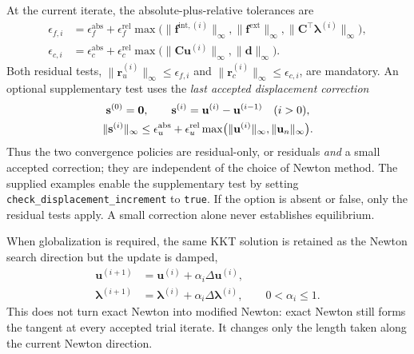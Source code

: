 \documentclass[11pt,a4paper]{article}
\newcommand{\vct}[1]{\mathbf{#1}}
\begin{document}
At the current iterate, the absolute-plus-relative tolerances are
\begin{equation}
\begin{aligned}
\epsilon_{f,i}&=\epsilon_f^{\mathrm{abs}}+\epsilon_f^{\mathrm{rel}}
\max\bigl(\lVert\vct f^{\mathrm{int},(i)}\rVert_\infty,
\lVert\vct f^{\mathrm{ext}}\rVert_\infty,
\lVert\vct C^\top\vct\lambda^{(i)}\rVert_\infty\bigr),\\
\epsilon_{c,i}&=\epsilon_c^{\mathrm{abs}}+\epsilon_c^{\mathrm{rel}}
\max\bigl(\lVert\vct C\vct u^{(i)}\rVert_\infty,
\lVert\vct d\rVert_\infty\bigr).
\end{aligned}
\label{eq:kkt-convergence-scales}
\end{equation}
Both residual tests, $\lVert\vct r_u^{(i)}\rVert_\infty\leq\epsilon_{f,i}$ and
$\lVert\vct r_c^{(i)}\rVert_\infty\leq\epsilon_{c,i}$, are mandatory.
An optional supplementary test uses the \emph{last accepted displacement correction}
\begin{gather}
\vct s^{(0)}=\vct0,\qquad
\vct s^{(i)}=\vct u^{(i)}-\vct u^{(i-1)}\quad(i>0),\notag\\
\lVert\vct s^{(i)}\rVert_\infty\leq
\epsilon_u^{\mathrm{abs}}+\epsilon_u^{\mathrm{rel}}
\max\bigl(\lVert\vct u^{(i)}\rVert_\infty,\lVert\vct u_n\rVert_\infty\bigr).
\label{eq:kkt-correction-convergence}
\end{gather}
Thus the two convergence policies are residual-only, or residuals \emph{and} a small accepted correction; they are independent of the choice of Newton method. The supplied examples enable the supplementary test by setting \texttt{check\_displacement\_increment} to \texttt{true}. If the option is absent or false, only the residual tests apply. A small correction alone never establishes equilibrium.

When globalization is required, the same KKT solution is retained as the Newton search direction but the update is damped,
\begin{align}
\vct u^{(i+1)}&=\vct u^{(i)}+\alpha_i\Delta\vct u^{(i)},\\
\vct\lambda^{(i+1)}&=\vct\lambda^{(i)}+\alpha_i\Delta\vct\lambda^{(i)},
\qquad 0<\alpha_i\leq1.
\label{eq:kkt-damped-update}
\end{align}
This does not turn exact Newton into modified Newton: exact Newton still forms the tangent at every accepted trial iterate.  It changes only the length taken along the current Newton direction.
\end{document}
